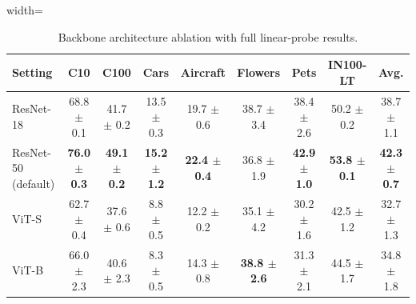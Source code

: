 \begin{table}[H]
\centering
\scriptsize
\setlength{\tabcolsep}{3.5pt}
\caption{Backbone architecture ablation with full linear-probe results.}
\label{tab:app_architecture_linear}
\begin{adjustbox}{width=\textwidth}
\begin{tabular}{l c c c c c c c c}
\toprule
Setting & C10 & C100 & Cars & Aircraft & Flowers & Pets & IN100-LT & Avg. \\
\midrule
ResNet-18 & 68.8 {\scriptsize$\pm$ 0.1} & 41.7 {\scriptsize$\pm$ 0.2} & 13.5 {\scriptsize$\pm$ 0.3} & 19.7 {\scriptsize$\pm$ 0.6} & 38.7 {\scriptsize$\pm$ 3.4} & 38.4 {\scriptsize$\pm$ 2.6} & 50.2 {\scriptsize$\pm$ 0.2} & 38.7 {\scriptsize$\pm$ 1.1} \\
ResNet-50 (default) & \textbf{76.0 {\scriptsize$\pm$ 0.3}} & \textbf{49.1 {\scriptsize$\pm$ 0.2}} & \textbf{15.2 {\scriptsize$\pm$ 1.2}} & \textbf{22.4 {\scriptsize$\pm$ 0.4}} & 36.8 {\scriptsize$\pm$ 1.9} & \textbf{42.9 {\scriptsize$\pm$ 1.0}} & \textbf{53.8 {\scriptsize$\pm$ 0.1}} & \textbf{42.3 {\scriptsize$\pm$ 0.7}} \\
ViT-S & 62.7 {\scriptsize$\pm$ 0.4} & 37.6 {\scriptsize$\pm$ 0.6} & 8.8 {\scriptsize$\pm$ 0.5} & 12.2 {\scriptsize$\pm$ 0.2} & 35.1 {\scriptsize$\pm$ 4.2} & 30.2 {\scriptsize$\pm$ 1.6} & 42.5 {\scriptsize$\pm$ 1.2} & 32.7 {\scriptsize$\pm$ 1.3} \\
ViT-B & 66.0 {\scriptsize$\pm$ 2.3} & 40.6 {\scriptsize$\pm$ 2.3} & 8.3 {\scriptsize$\pm$ 0.5} & 14.3 {\scriptsize$\pm$ 0.8} & \textbf{38.8 {\scriptsize$\pm$ 2.6}} & 31.3 {\scriptsize$\pm$ 2.1} & 44.5 {\scriptsize$\pm$ 1.7} & 34.8 {\scriptsize$\pm$ 1.8} \\
\bottomrule
\end{tabular}
\end{adjustbox}
\end{table}
